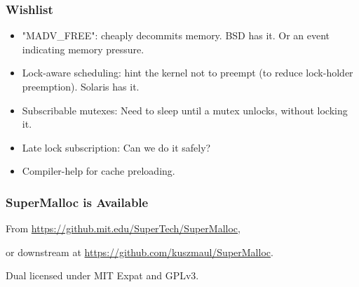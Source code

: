 \documentclass[xcolor=dvipsnames,14pt]{beamer}
\begin{document}
\begin{frame}[fragile]
\frametitle{Wishlist}

\begin{itemize}
\item "MADV_FREE": cheaply decommits memory.  BSD has it.
Or an event indicating memory pressure.
\item Lock-aware scheduling: hint the kernel not to preempt (to
reduce lock-holder preemption).  Solaris has it.
\item Subscribable mutexes:  Need to sleep until a mutex unlocks, without locking it.
\item Late lock subscription: Can we do it safely?
\item Compiler-help for cache preloading.
\end{itemize}

\end{frame}

\begin{frame}
\frametitle{SuperMalloc is Available}

From {\small \url{https://github.mit.edu/SuperTech/SuperMalloc}},

or downstream at {\small \url{https://github.com/kuszmaul/SuperMalloc}}.

Dual licensed under MIT Expat and GPLv3.
\end{frame}
\end{document}

